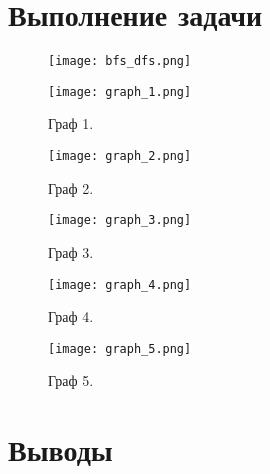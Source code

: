 \documentclass[12pt, a4paper]{report}
\begin{document}
	\newpage

	\section*{Выполнение задачи}

	\newpage
	\vfill

	\begin{figure}
		\texttt{[image: bfs\_dfs.png]}
	\end{figure}

	\begin{figure}[h]
		\centering
		\texttt{[image: graph\_1.png]}
		\caption{Граф 1.}
	\end{figure}
	\begin{figure}[h]
		\centering
		\texttt{[image: graph\_2.png]}
		\caption{Граф 2.}
	\end{figure}
	\begin{figure}[h]
		\centering
		\texttt{[image: graph\_3.png]}
		\caption{Граф 3.}
	\end{figure}
	\begin{figure}[h]
		\centering
		\texttt{[image: graph\_4.png]}
		\caption{Граф 4.}
	\end{figure}
	\begin{figure}[h]
		\centering
		\texttt{[image: graph\_5.png]}
		\caption{Граф 5.}
	\end{figure}

	\vfill
	\clearpage

	\section*{Выводы}
\end{document}
